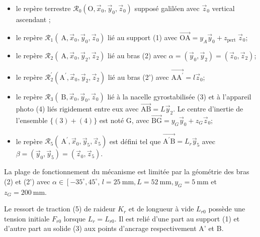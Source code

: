 \documentclass[10pt]{article}
\begin{document}
\begin{itemize}
  \item le repère terrestre $\mathcal{R}_{0}\left(\mathrm{O}, \vec{x}_{0}, \vec{y}_{0}, \vec{z}_{0}\right)$ supposé galiléen avec $\vec{z}_{0}$ vertical ascendant ;

  \item le repère $\mathcal{R}_{1}\left(\mathrm{~A}, \vec{x}_{0}, \vec{y}_{0}, \vec{z}_{0}\right)$ lié au support (1) avec $\overrightarrow{\mathrm{OA}}=y_{A} \vec{y}_{0}+z_{\text {pert }} \vec{z}_{0}$;

  \item le repère $\mathcal{R}_{2}\left(\mathrm{~A}, \vec{x}_{0}, \vec{y}_{2}, \vec{z}_{2}\right)$ lié au bras (2) avec $\alpha=\left(\vec{y}_{0}, \vec{y}_{2}\right)=\left(\vec{z}_{0}, \vec{z}_{2}\right)$;

  \item le repère $\mathcal{R}_{2}^{\prime}\left(\mathrm{A}^{\prime}, \vec{x}_{0}, \vec{y}_{2}, \vec{z}_{2}\right)$ lié au bras (2') avec $\overrightarrow{\mathrm{AA}^{\prime}}=l \vec{z}_{0}$;

  \item le repère $\mathcal{R}_{3}\left(\mathrm{~B}, \vec{x}_{0}, \vec{y}_{0}, \vec{z}_{0}\right)$ lié à la nacelle gyrostabilisée (3) et à l'appareil photo (4) liés rigidement entre eux avec $\overrightarrow{\mathrm{AB}}=L \vec{y}_{2}$. Le centre d'inertie de l'ensemble $\{(3)+(4)\}$ est noté $\mathrm{G}$, avec $\overrightarrow{\mathrm{BG}}=y_{G} \vec{y}_{0}+z_{G} \vec{z}_{0} ;$

  \item le repère $\mathcal{R}_{5}\left(\mathrm{~A}^{\prime}, \vec{x}_{0}, \vec{y}_{5}, \vec{z}_{5}\right)$ est défini tel que $\overrightarrow{\mathrm{A}^{\prime} \mathrm{B}}=L_{r} \vec{y}_{5}$ avec $\beta=\left(\vec{y}_{0}, \vec{y}_{5}\right)=\left(\vec{z}_{0}, \vec{z}_{5}\right)$.

\end{itemize}

La plage de fonctionnement du mécanisme est limitée par la géométrie des bras (2) et (2') avec $\alpha \in\left[-35^{\circ}, 45^{\circ}\right.$, $l=25 \mathrm{~mm}, L=52 \mathrm{~mm}, y_{G}=5 \mathrm{~mm}$ et $z_{G}=200 \mathrm{~mm}$.

Le ressort de traction (5) de raideur $K_{r}$ et de longueur à vide $L_{r 0}$ possède une tension initiale $F_{r 0}$ lorsque $L_{r}=L_{r 0}$. Il est relié d'une part au support (1) et d'autre part au solide (3) aux points d'ancrage respectivement A' et B.
\end{document}
